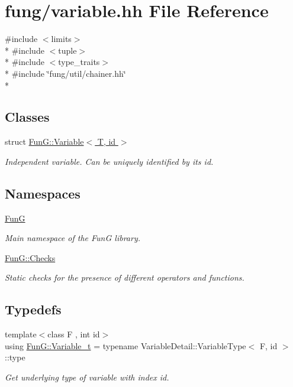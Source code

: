 \hypertarget{variable_8hh}{}\section{fung/variable.hh File Reference}
\label{variable_8hh}
{\ttfamily \#include $<$limits$>$}\\*
{\ttfamily \#include $<$tuple$>$}\\*
{\ttfamily \#include $<$type\+\_\+traits$>$}\\*
{\ttfamily \#include \char`\"{}fung/util/chainer.\+hh\char`\"{}}\\*
\subsection*{Classes}
\begin{DoxyCompactItemize}
\item 
struct \hyperlink{structFunG_1_1Variable}{Fun\+G\+::\+Variable$<$ T, id $>$}
\begin{DoxyCompactList}\small\item\em Independent variable. Can be uniquely identified by its id. \end{DoxyCompactList}\end{DoxyCompactItemize}
\subsection*{Namespaces}
\begin{DoxyCompactItemize}
\item 
 \hyperlink{namespaceFunG}{Fun\+G}
\begin{DoxyCompactList}\small\item\em Main namespace of the Fun\+G library. \end{DoxyCompactList}\item 
 \hyperlink{namespaceFunG_1_1Checks}{Fun\+G\+::\+Checks}
\begin{DoxyCompactList}\small\item\em Static checks for the presence of different operators and functions. \end{DoxyCompactList}\end{DoxyCompactItemize}
\subsection*{Typedefs}
\begin{DoxyCompactItemize}
\item 
{\footnotesize template$<$class F , int id$>$ }\\using \hyperlink{namespaceFunG_a3d589ef7d011a46a72847eabcbbb4532}{Fun\+G\+::\+Variable\+\_\+t} = typename Variable\+Detail\+::\+Variable\+Type$<$ F, id $>$\+::type
\begin{DoxyCompactList}\small\item\em Get underlying type of variable with index id. \end{DoxyCompactList}\end{DoxyCompactItemize}
